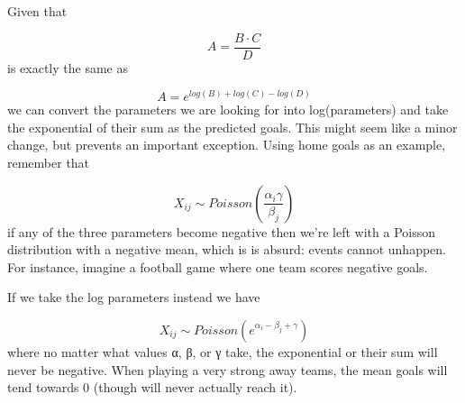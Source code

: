 \documentclass[]{article}
\begin{document}
Given that

\[ A = \frac{B \cdot C}{D}\] is exactly the same as

\[ A = e ^{log(B) + log(C) - log(D)}\] we can convert the parameters we
are looking for into log(parameters) and take the exponential of their
sum as the predicted goals. This might seem like a minor change, but
prevents an important exception. Using home goals as an example,
remember that

\[X_{ij} \sim Poisson(\frac{α_{i}γ}{β_{j}})\] if any of the three
parameters become negative then we're left with a Poisson distribution
with a negative mean, which is is absurd: events cannot unhappen. For
instance, imagine a football game where one team scores negative goals.

If we take the log parameters instead we have

\[X_{ij} \sim Poisson(e ^ {α_{i} - β_{j} + γ})\] where no matter what
values α, β, or γ take, the exponential or their sum will never be
negative. When playing a very strong away teams, the mean goals will
tend towards 0 (though will never actually reach it).
\end{document}
